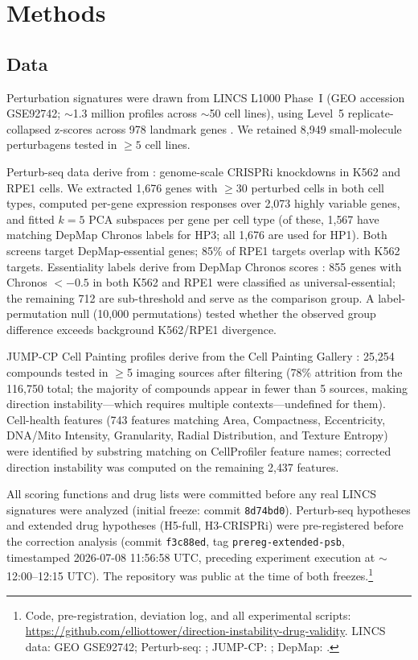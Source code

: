 \documentclass[10pt]{article}
\begin{document}
\section{Methods}

\subsection{Data}

Perturbation signatures were drawn from LINCS L1000 Phase~I (GEO accession
GSE92742; $\sim$1.3 million profiles across $\sim$50 cell lines),
using Level~5 replicate-collapsed z-scores across 978 landmark genes
\citep{subramanian2017next}. We retained 8{,}949 small-molecule
perturbagens tested in $\geq5$ cell lines.

Perturb-seq data derive from \citet{replogle2022mapping}: genome-scale
CRISPRi knockdowns in K562 and RPE1 cells. We extracted 1{,}676 genes
with $\geq$30 perturbed cells in both cell types, computed per-gene
expression responses over 2{,}073 highly variable genes, and fitted
$k = 5$ PCA subspaces per gene per cell type (of these, 1{,}567 have
matching DepMap Chronos labels for HP3; all 1{,}676 are used for HP1).
Both screens target DepMap-essential genes; 85\% of RPE1 targets overlap
with K562 targets. Essentiality labels derive from DepMap Chronos scores
\citep{dempster2021chronos}: 855 genes with Chronos $< -0.5$ in both
K562 and RPE1 were classified as universal-essential; the remaining 712
are sub-threshold and serve as the comparison group. A label-permutation
null (10{,}000 permutations) tested whether the observed group difference
exceeds background K562/RPE1 divergence.

JUMP-CP Cell Painting profiles derive from the Cell Painting Gallery
\citep{chandrasekaran2023jump}: 25{,}254 compounds tested in $\geq$5
imaging sources after filtering (78\% attrition from the 116{,}750
total; the majority of compounds appear in fewer than 5 sources,
making direction instability---which requires multiple
contexts---undefined for them). Cell-health features (743 features matching Area,
Compactness, Eccentricity, DNA/Mito Intensity, Granularity, Radial
Distribution, and Texture Entropy) were identified by substring matching
on CellProfiler feature names; corrected direction instability was computed
on the remaining 2{,}437 features.

All scoring functions and drug lists were committed before any real LINCS
signatures were analyzed (initial freeze: commit \texttt{8d74bd0}).
Perturb-seq hypotheses and extended drug hypotheses (H5-full,
H3-CRISPRi) were pre-registered before the correction analysis
(commit \texttt{f3c88ed}, tag \texttt{prereg-extended-psb}, timestamped
2026-07-08 11:56:58 UTC, preceding experiment execution at
${\sim}$12:00--12:15 UTC). The repository was public at the time of both
freezes.\footnote{Code, pre-registration, deviation log, and all
experimental scripts:
\url{https://github.com/elliottower/direction-instability-drug-validity}.
LINCS data: GEO GSE92742; Perturb-seq: \citet{replogle2022mapping};
JUMP-CP: \citet{chandrasekaran2023jump}; DepMap: \citet{dempster2021chronos}.}
\end{document}
